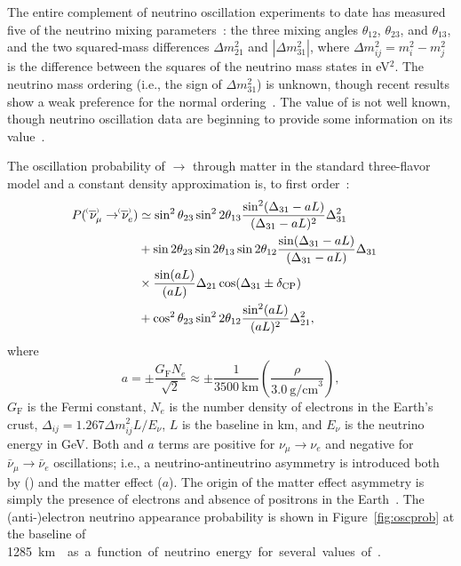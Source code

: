 The entire complement of neutrino oscillation experiments to date has measured five of the neutrino mixing parameters~\cite{Esteban:2018azc,deSalas:2017kay,Capozzi:2017yic}: the three mixing angles $\theta_{12}$, $\theta_{23}$, and $\theta_{13}$, and the two squared-mass differences $\Delta m^{2}_{21}$ and $|\Delta m^{2}_{31}|$, where $\Delta m^2_{ij} = m^2_{i} - m^{2}_{j}$ is the difference between the squares of the neutrino mass states in eV$^{2}$.
The neutrino mass ordering (i.e., the sign of $\Delta m^{2}_{31}$) is unknown, though recent results show a weak preference for the normal ordering~\cite{Abe:2018wpn,PhysRevD.97.072001,PhysRevLett.123.151803}.
The value of \deltacp is not well known, though neutrino oscillation data are beginning to provide some information on its value~\cite{Abe:2018wpn,Abe:2019vii}.

The oscillation probability of \numu $\rightarrow$ \nue through matter in the standard three-flavor model and a constant density approximation is, to first order~\cite{Nunokawa:2007qh}:
\begin{equation}
  \begin{aligned}
    P(\;\nu^{\bracketbar}_\mu \rightarrow \nu^{\bracketbar}_e) & \simeq \sin^2 \theta_{23} \sin^2 2 \theta_{13} 
    \frac{ \sin^2(\Delta_{31} - aL)}{(\Delta_{31}-aL)^2} \Delta_{31}^2 \\
    & + \sin 2 \theta_{23} \sin 2 \theta_{13} \sin 2 \theta_{12}\frac{ \sin(\Delta_{31} - aL)}{(\Delta_{31}-aL)} \Delta_{31} \\
    &\times \frac{\sin(aL)}{(aL)} \Delta_{21} \cos (\Delta_{31} \pm \deltacp) & \\
    & + \cos^2 \theta_{23} \sin^2 2 \theta_{12} \frac {\sin^2(aL)}{(aL)^2} \Delta_{21}^2,
  \end{aligned}
  \label{eqn:appprob}
\end{equation}
where
\begin{equation*}
  a = \pm \frac{G_{\mathrm{F}}N_e}{\sqrt{2}} \approx \pm\frac{1}{3500~\mathrm{km}}\left(\frac{\rho}{3.0~\mathrm{g/cm}^{3}}\right),
\end{equation*}
$G_{\mathrm{F}}$ is the Fermi constant, $N_e$ is the number density of electrons in the Earth's crust, $\Delta_{ij} = 1.267 \Delta m^2_{ij} L/E_\nu$, $L$ is the baseline in km, and $E_\nu$ is the neutrino energy in GeV. 
Both \deltacp and $a$ terms are positive for
$\nu_\mu \to \nu_e$ and negative for $\bar{\nu}_\mu \to \bar{\nu}_e$ oscillations; i.e.,
a neutrino-antineutrino asymmetry is introduced both by  (\deltacp)
and the matter effect ($a$). The origin of the matter effect asymmetry 
is simply the presence of electrons and absence of positrons in the Earth~\cite{Wolfenstein:1977ue,Mikheev:1986gs}.
The (anti-)electron neutrino appearance probability
is shown in 
Figure~\ref{fig:oscprob} at the  baseline of \SI{1285}\km{} as a function of neutrino 
energy for several values of \deltacp.

